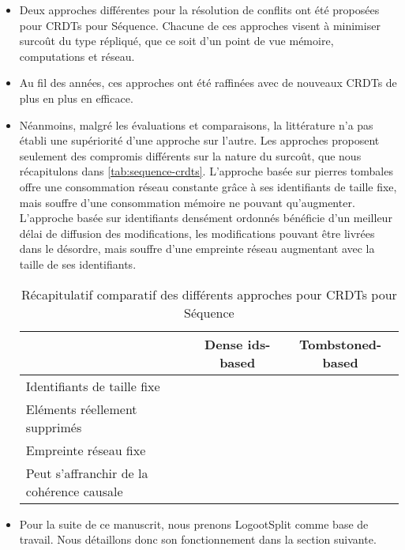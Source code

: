 \documentclass[12pt]{thesul}
\renewcommand{\checkmark}{\ding{51}}
\newcommand{\ballotx}{\ding{55}}
\begin{document}
\begin{itemize}
  \item Deux approches différentes pour la résolution de conflits ont été proposées pour \acp{CRDT} pour Séquence.
    Chacune de ces approches visent à minimiser surcoût du type répliqué, que ce soit d'un point de vue mémoire, computations et réseau.
  \item Au fil des années, ces approches ont été raffinées avec de nouveaux \acp{CRDT} de plus en plus en efficace.
  \item Néanmoins, malgré les évaluations et comparaisons, la littérature n'a pas établi une supériorité d'une approche sur l'autre.
    Les approches proposent seulement des compromis différents sur la nature du surcoût, que nous récapitulons dans \autoref{tab:sequence-crdts}.
    L'approche basée sur pierres tombales offre une consommation réseau constante grâce à ses identifiants de taille fixe, mais souffre d'une consommation mémoire ne pouvant qu'augmenter.
    L'approche basée sur identifiants densément ordonnés bénéficie d'un meilleur délai de diffusion des modifications, les modifications pouvant être livrées dans le désordre, mais souffre d'une empreinte réseau augmentant avec la taille de ses identifiants.

    \begin{table}[!ht]
      \centering
      \caption{Récapitulatif comparatif des différents approches pour \acp{CRDT} pour Séquence}
      \label{tab:sequence-crdts}
        \begin{tabular}{lcc}
          \toprule
                                                    & Dense ids-based & Tombstoned-based  \\
          \midrule
          Identifiants de taille fixe               & \ballotx        & \checkmark        \\
          Eléments réellement supprimés             & \checkmark      & \ballotx          \\
          Empreinte réseau fixe                     & \ballotx        & \checkmark        \\
          Peut s'affranchir de la cohérence causale & \checkmark      & \ballotx          \\
          \bottomrule
        \end{tabular}
    \end{table}

  \item Pour la suite de ce manuscrit, nous prenons LogootSplit comme base de travail.
    Nous détaillons donc son fonctionnement dans la section suivante.
\end{itemize}
\end{document}
